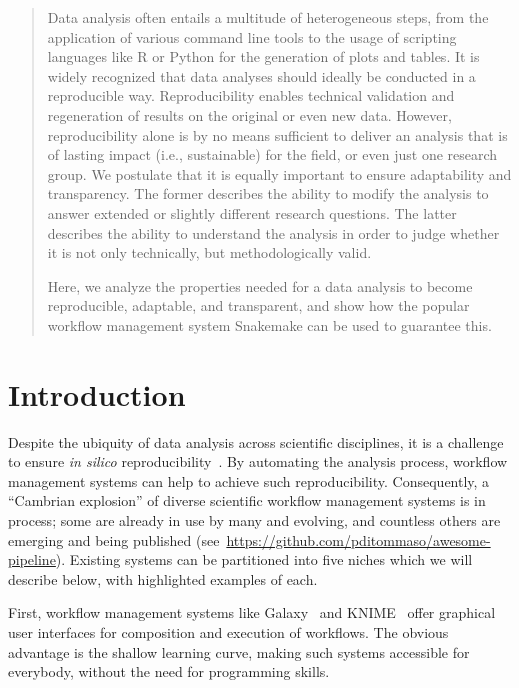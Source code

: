 \documentclass[parskip=half, DIV=18]{scrartcl}
\let\plainurl\url
\renewcommand{\url}[1]{\protect\plainurl{#1}}
\begin{document}
\begin{abstract}
	Data analysis often entails a multitude of heterogeneous steps, from the application of various command line tools to the usage of scripting languages like R or Python for the generation of plots and tables.
	It is widely recognized that data analyses should ideally be conducted in a reproducible way.
	Reproducibility enables technical validation and regeneration of results on the original or even new data.
	However, reproducibility alone is by no means sufficient to deliver an analysis that is of lasting impact (i.e., sustainable) for the field, or even just one research group.
	We postulate that it is equally important to ensure adaptability and transparency.
	The former describes the ability to modify the analysis to answer extended or slightly different research questions.
	The latter describes the ability to understand the analysis in order to judge whether it is not only technically, but methodologically valid.

	Here, we analyze the properties needed for a data analysis to become reproducible, adaptable, and transparent, and show how the popular workflow management system Snakemake can be used to guarantee this.
\end{abstract}

\section{Introduction}\label{sec:introduction}

Despite the ubiquity of data analysis across scientific disciplines, it is a challenge to ensure \emph{in silico} reproducibility~\parencite{Mesirov2010,Baker2016,Munaf__2017}.
By automating the analysis process, workflow management systems can help to achieve such reproducibility.
Consequently, a ``Cambrian explosion'' of diverse scientific workflow management systems is in process; some are already in use by many and evolving, and countless others are emerging and being published (see~\url{https://github.com/pditommaso/awesome-pipeline}).
Existing systems can be partitioned into five niches which we will describe below, with highlighted examples of each.

First, workflow management systems like Galaxy~\parencite{Afgan2018} and KNIME~\parencite{wiswedel2007} offer graphical user interfaces for composition and execution of workflows.
The obvious advantage is the shallow learning curve, making such systems accessible for everybody, without the need for programming skills.
\end{document}
